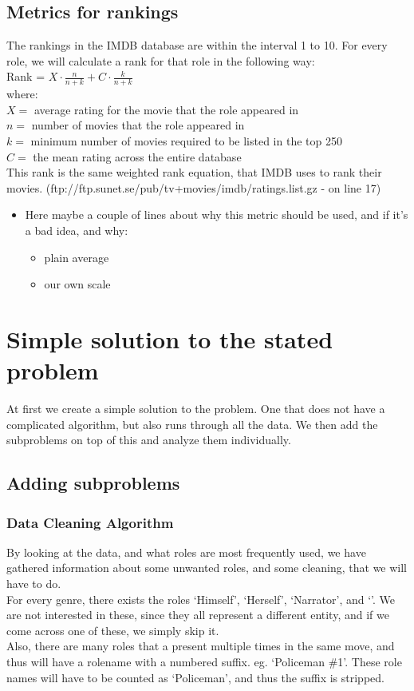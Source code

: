 \documentclass[a4paper,11pt]{article}
\begin{document}
\subsection{Metrics for rankings}
The rankings in the IMDB database are within the interval 1 to 10. For every role, we will calculate a rank for that role in the following way:\\
Rank = $X \cdot \frac{n}{n+k} + C \cdot \frac{k}{n+k}$\\
where:        \\
$X =$ average rating for the movie that the role appeared in\\
$n =$ number of movies that the role appeared in\\
$k =$ minimum number of movies required to be listed in the top 250\\
$C =$ the mean rating across the entire database\\
This rank is the same weighted rank equation, that IMDB uses to rank their movies. (ftp://ftp.sunet.se/pub/tv+movies/imdb/ratings.list.gz - on line 17)


\begin{itemize}
\item Here maybe a couple of lines about why this metric should be used, and if it’s a bad idea, and why:
    \begin{itemize}
        \item plain average
        \item our own scale
    \end{itemize}
\end{itemize}

\section{Simple solution to the stated problem}
At first we create a simple solution to the problem. One that does not have a complicated algorithm, but also runs through all the data. We then add the subproblems on top of this and analyze them individually.\\

\subsection{Adding subproblems}
\subsubsection{Data Cleaning Algorithm}
By looking at the data, and what roles are most frequently used, we have gathered information about some unwanted roles, and some cleaning, that we will have to do.\\
For every genre, there exists the roles ‘Himself’, ‘Herself’, ‘Narrator’, and ‘’. We are not interested in these, since they all represent a different entity, and if we come across one of these, we simply skip it.\\
Also, there are many roles that a present multiple times in the same move, and thus will have a rolename with a numbered suffix. eg. ‘Policeman \#1’. These role names will have to be counted as ‘Policeman’, and thus the suffix is stripped.\\
\end{document}
